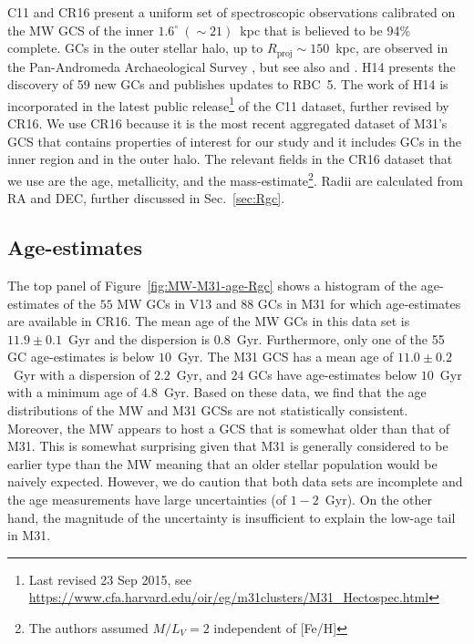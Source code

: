 \documentclass[a4paper,fleqn,usenatbib]{mnras}
\providecommand{\DIFadd}[1]{{\protect\color{blue}\uwave{#1}}} %
\providecommand{\DIFdel}[1]{{\protect\color{red}\sout{#1}}}                      %
\providecommand{\DIFaddbegin}{} %
\providecommand{\DIFaddend}{} %
\providecommand{\DIFdelbegin}{} %
\providecommand{\DIFdelend}{} %
\newcommand{\DIFscaledelfig}{0.5}
\newlength{\DIFdelgraphicswidth} %
\newlength{\DIFdelgraphicsheight} %
\newcommand{\DIFaddincludegraphics}[2][]{{\color{blue}\fbox{\DIFOincludegraphics[#1]{#2}}}} %
\newcommand{\DIFdelincludegraphics}[2][]{%
\sbox{\DIFdelgraphicsbox}{\DIFOincludegraphics[#1]{#2}}%
\settoboxwidth{\DIFdelgraphicswidth}{\DIFdelgraphicsbox} %
\settoboxtotalheight{\DIFdelgraphicsheight}{\DIFdelgraphicsbox} %
\scalebox{\DIFscaledelfig}{%
\parbox[b]{\DIFdelgraphicswidth}{\usebox{\DIFdelgraphicsbox}\\[-\baselineskip] \rule{\DIFdelgraphicswidth}{0em}}\llap{\resizebox{\DIFdelgraphicswidth}{\DIFdelgraphicsheight}{%
\setlength{\unitlength}{\DIFdelgraphicswidth}%
\begin{picture}(1,1)%
\thicklines\linethickness{2pt} %
{\color[rgb]{1,0,0}\put(0,0){\framebox(1,1){}}}%
{\color[rgb]{1,0,0}\put(0,0){\line( 1,1){1}}}%
{\color[rgb]{1,0,0}\put(0,1){\line(1,-1){1}}}%
\end{picture}%
}\hspace*{3pt}}} %
} %
\DeclareRobustCommand{\DIFaddbegin}{\DIFOaddbegin \let\includegraphics\DIFaddincludegraphics} %
\DeclareRobustCommand{\DIFaddend}{\DIFOaddend \let\includegraphics\DIFOincludegraphics} %
\DeclareRobustCommand{\DIFdelbegin}{\DIFOdelbegin \let\includegraphics\DIFdelincludegraphics} %
\DeclareRobustCommand{\DIFdelend}{\DIFOaddend \let\includegraphics\DIFOincludegraphics} %
\begin{document}
C11 and CR16 present a uniform set of spectroscopic observations calibrated
on the MW GCS of the inner $1.6^\circ~({\sim}21)$~kpc that
is believed to be 94\% complete. GCs in the outer stellar halo, up to
\DIFdelbegin \DIFdel{$R_{\text{proj}}\sim150$}\DIFdelend \DIFaddbegin \DIFadd{$r_{\text{proj}}\sim150$}\DIFaddend ~kpc, are observed in the Pan-Andromeda Archaeological
Survey \citep[PAndAS, ][hereafter H14]{2014MNRAS.442.2165H}, but see also
\citet{2014MNRAS.442.2929V} and \citet{2019MNRAS.484.1756M}. H14 presents the
discovery of 59 new GCs and publishes updates to RBC~5. The work of H14 is
incorporated in the latest public release\footnote{Last revised 23 Sep 2015, see
\url{https://www.cfa.harvard.edu/oir/eg/m31clusters/M31_Hectospec.html}}
of the C11 dataset, further revised by CR16. We use CR16 because it is the most
recent aggregated dataset of M31's GCS that contains properties of interest
for our study and it includes GCs in the inner region and in the outer halo. The
relevant fields in the CR16 dataset that we use are the age, metallicity, and the
mass-estimate\footnote{The authors assumed $M/L_V = 2$ independent of [Fe/H]}.
Radii are calculated from RA and DEC, further discussed in Sec.~\ref{sec:Rgc}.

\subsection{Age-estimates}
The top panel of Figure~\ref{fig:MW-M31-age-Rgc} shows a histogram of the age-estimates
of the $55$ MW GCs in V13 and $88$ GCs in M31 for which age-estimates are available
in CR16. The mean age of the MW GCs in this data set is $11.9 \pm 0.1$~Gyr and the 
dispersion is $0.8$~Gyr. Furthermore, only one of the 55 GC age-estimates is
below $10$~Gyr. The M31 GCS has a mean age of $11.0 \pm 0.2$~Gyr with a dispersion 
of $2.2$~Gyr, and $24$ GCs have age-estimates below $10$~Gyr with a minimum age 
of $4.8$~Gyr. Based on these data, we find that the age distributions of the MW 
and M31 GCSs are not statistically consistent. Moreover, the MW appears 
to host a GCS that is somewhat older than that of M31.
This is somewhat surprising given that M31 is generally considered to be earlier
type than the MW meaning that an older stellar population would be naively expected.
However, we do caution that both data sets are incomplete and the age 
measurements have large uncertainties (of $1-2$~Gyr). On the other hand, the 
magnitude of the uncertainty is insufficient to explain the low-age tail in M31.
\end{document}
